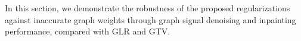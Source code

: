 
In this section, we demonstrate the robustness of the proposed regularizations against inaccurate graph weights through graph signal denoising and inpainting performance, compared with GLR and GTV.